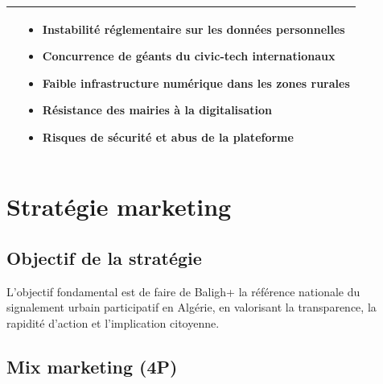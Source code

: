 \documentclass[12pt,a4paper]{report}
\begin{document}
\begin{table}[H]
\begin{tabularx}{\linewidth}{XX}
\begin{itemize}[leftmargin=*,topsep=2pt,itemsep=1pt]
    \end{itemize}
    &
    \begin{itemize}[leftmargin=*,topsep=2pt,itemsep=1pt]
      \item Instabilité réglementaire sur les données personnelles
      \item Concurrence de géants du civic-tech internationaux
      \item Faible infrastructure numérique dans les zones rurales
      \item Résistance des mairies à la digitalisation
      \item Risques de sécurité et abus de la plateforme
    \end{itemize}
    \\
    \bottomrule
  \end{tabularx}
\end{table}

\section{Stratégie marketing}

\subsection{Objectif de la stratégie}
L'objectif fondamental est de faire de Baligh+ la référence nationale du
signalement urbain participatif en Algérie, en valorisant la transparence, la
rapidité d'action et l'implication citoyenne.

\subsection{Mix marketing (4P)}
\end{document}
